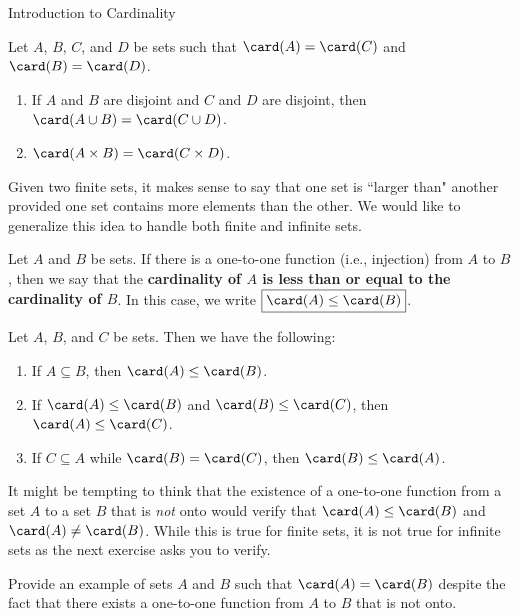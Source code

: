 \begin{section}{Introduction to Cardinality}
\begin{theorem}
Let $A$, $B$, $C$, and $D$ be sets such that $\card(A)=\card(C)$ and $\card(B)=\card(D)$.
\begin{enumerate}[label=\textrm{(\alph*)}]
\item If $A$ and $B$ are disjoint and $C$ and $D$ are disjoint, then $\card(A\cup B)=\card(C\cup D)$.
\item $\card(A\times B)=\card(C\times D)$.
\end{enumerate}
\end{theorem}

Given two finite sets, it makes sense to say that one set is ``larger than" another provided one set contains more elements than the other. We would like to generalize this idea to handle both finite and infinite sets. 

\begin{definition}
Let $A$ and $B$ be sets. If there is a one-to-one function (i.e., injection) from $A$ to $B$, then we say that the \textbf{cardinality of $A$ is less than or equal to the cardinality of $B$}. In this case, we write $\boxed{\card(A)\leq\card(B)}$.
\end{definition}

\begin{theorem}
Let $A$, $B$, and $C$ be sets. Then we have the following:
\begin{enumerate}[label=\textrm{(\alph*)}]
\item If $A\subseteq B$, then $\card(A)\leq \card(B)$.
\item If $\card(A)\leq \card(B)$ and $\card(B)\leq \card(C)$, then $\card(A)\leq \card(C)$.
\item If $C\subseteq A$ while $\card(B)=\card(C)$, then $\card(B)\leq \card(A)$.
\end{enumerate}
\end{theorem}

It might be tempting to think that the existence of a one-to-one function from a set $A$ to a set $B$ that is \emph{not} onto would verify that $\card(A)\leq \card(B)$ and $\card(A)\neq \card(B)$. While this is true for finite sets, it is not true for infinite sets as the next exercise asks you to verify.

\begin{exercise}
Provide an example of sets $A$ and $B$ such that $\card(A)=\card(B)$ despite the fact that there exists a one-to-one function from $A$ to $B$ that is not onto.
\end{exercise}


\end{section}
